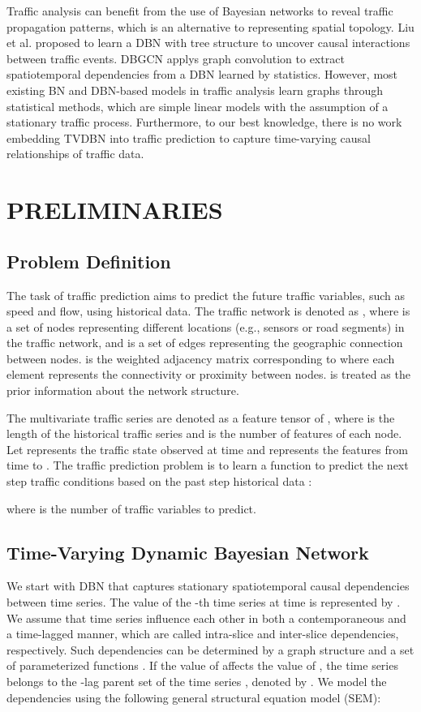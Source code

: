 \documentclass[letterpaper, 10 pt, conference]{ieeeconf}
\begin{document}
Traffic analysis can benefit from the use of Bayesian networks to reveal traffic propagation patterns, which is an alternative to representing spatial topology. Liu et al.\cite{liu2011discovering} proposed to learn a DBN with tree structure to uncover causal interactions between traffic events. DBGCN \cite{luan2022traffic} applys graph convolution to extract spatiotemporal dependencies from a DBN learned by statistics. However, most existing BN and DBN-based models in traffic analysis learn graphs through statistical methods, which are simple linear models with the assumption of a stationary traffic process. Furthermore, to our best knowledge, there is no work embedding TVDBN into traffic prediction to capture time-varying causal relationships of traffic data. 

\section{PRELIMINARIES}


\subsection{Problem Definition}

The task of traffic prediction aims to predict the future traffic variables, such as speed and flow, using historical data. The traffic network is denoted as , where  is a set of  nodes representing different locations (e.g., sensors or road segments) in the traffic network, and  is a set of edges representing the geographic connection between nodes.  is the weighted adjacency matrix corresponding to  where each element represents the connectivity or proximity between nodes.  is treated as the prior information about the network structure.

The multivariate traffic series are denoted as a feature tensor  of , where  is the length of the historical traffic series and  is the number of features of each node. Let  represents the traffic state observed at time  and  represents the features from time  to . The traffic prediction problem is to learn a function  to predict the next  step traffic conditions   based on the past  step historical data :

where  is the number of traffic variables to predict.

\subsection{Time-Varying Dynamic Bayesian Network}
We start with DBN that captures stationary spatiotemporal causal dependencies between time series. The value of the -th time series at time  is represented by . We assume that time series influence each other in both a contemporaneous and a time-lagged manner, which are called intra-slice and inter-slice dependencies, respectively. Such dependencies can be determined by a graph structure  and a set of parameterized functions . If the value of  affects the value of , the time series  belongs to the -lag parent set of the time series , denoted by . We model the dependencies using the following general structural equation model (SEM):
\end{document}
